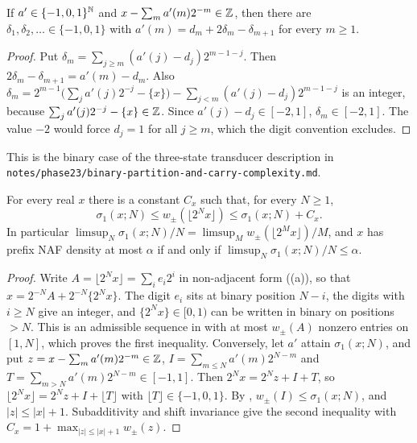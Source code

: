 \documentclass[11pt]{article}
\newcommand{\tpath}[1]{\nolinkurl{#1}}
\newcommand{\wpm}{w_{\pm}}
\begin{document}
\begin{lemma}\label{lem:paths}
If $a'\in\{-1,0,1\}^{\mathbb N}$ and $x-\sum_ma'(m)2^{-m}\in\mathbb Z$, then there are $\delta_1,\delta_2,\dots\in\{-1,0,1\}$ with $a'(m)=d_m+2\delta_m-\delta_{m+1}$ for every $m\ge1$.
\end{lemma}

\begin{proof}
Put $\delta_m=\sum_{j\ge m}(a'(j)-d_j)2^{m-1-j}$. Then $2\delta_m-\delta_{m+1}=a'(m)-d_m$. Also $\delta_m=2^{m-1}\bigl(\sum_ja'(j)2^{-j}-\{x\}\bigr)-\sum_{j<m}(a'(j)-d_j)2^{m-1-j}$ is an integer, because $\sum_ja'(j)2^{-j}-\{x\}\in\mathbb Z$. Since $a'(j)-d_j\in[-2,1]$, $\delta_m\in[-2,1]$. The value $-2$ would force $d_j=1$ for all $j\ge m$, which the digit convention excludes.
\end{proof}

This is the binary case of the three-state transducer description in \tpath{notes/phase23/binary-partition-and-carry-complexity.md}.

\begin{lemma}\label{lem:sigma-naf}
For every real $x$ there is a constant $C_x$ such that, for every $N\ge1$,
\[
\sigma_1(x;N)\le\wpm(\lfloor2^Nx\rfloor)\le\sigma_1(x;N)+C_x.
\]
In particular $\limsup_N\sigma_1(x;N)/N=\limsup_M\wpm(\lfloor2^Mx\rfloor)/M$, and $x$ has prefix NAF density at most $\alpha$ if and only if $\limsup_N\sigma_1(x;N)/N\le\alpha$.
\end{lemma}

\begin{proof}
Write $A=\lfloor2^Nx\rfloor=\sum_ie_i2^i$ in non-adjacent form ((a)), so that $x=2^{-N}A+2^{-N}\{2^Nx\}$. The digit $e_i$ sits at binary position $N-i$, the digits with $i\ge N$ give an integer, and $\{2^Nx\}\in[0,1)$ can be written in binary on positions $>N$. This is an admissible sequence in  with at most $\wpm(A)$ nonzero entries on $[1,N]$, which proves the first inequality. Conversely, let $a'$ attain $\sigma_1(x;N)$, and put $z=x-\sum_ma'(m)2^{-m}\in\mathbb Z$, $I=\sum_{m\le N}a'(m)2^{N-m}$ and $T=\sum_{m>N}a'(m)2^{N-m}\in[-1,1]$. Then $2^Nx=2^Nz+I+T$, so $\lfloor2^Nx\rfloor=2^Nz+I+\lfloor T\rfloor$ with $\lfloor T\rfloor\in\{-1,0,1\}$. By , $\wpm(I)\le\sigma_1(x;N)$, and $|z|\le|x|+1$. Subadditivity and shift invariance give the second inequality with $C_x=1+\max_{|z|\le|x|+1}\wpm(z)$.
\end{proof}
\end{document}
